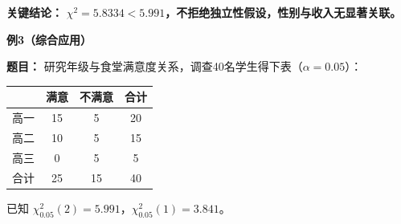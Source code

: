 \begin{examplebox}
	\textbf{\textcolor{CExample}{关键结论：}}
	\textbf{$\chi^2=5.8334<5.991$，不拒绝独立性假设，性别与收入无显著关联。}

	\medskip
	\textbf{\textcolor{CExample}{例3（综合应用）}}

	\textbf{\textcolor{CExample}{题目：}}
	研究年级与食堂满意度关系，调查40名学生得下表（$\alpha=0.05$）：

	\begin{center}
		\begin{tabular}{c|cc|c}
			& 满意 & 不满意 & 合计 \\ \hline
			高一 & 15 & 5 & 20 \\
			高二 & 10 & 5 & 15 \\
			高三 & 0 & 5 & 5 \\ \hline
			合计 & 25 & 15 & 40
		\end{tabular}
	\end{center}
	已知 $\chi^2_{0.05}(2)=5.991$，$\chi^2_{0.05}(1)=3.841$。


\end{examplebox}
